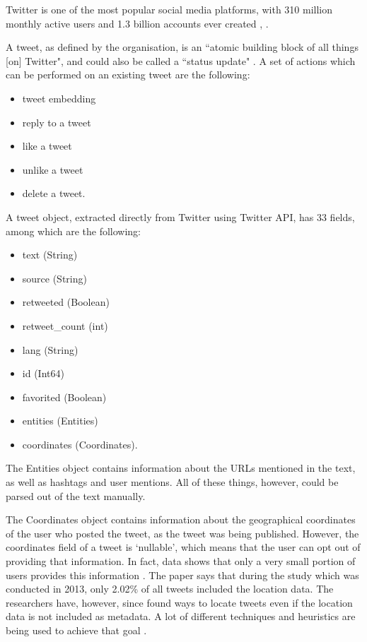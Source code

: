 Twitter is one of the most popular social media platforms, with 310 million monthly active users and 1.3 billion accounts ever created \cite{twittertcstats}, \cite{twitterbistats}. 

A tweet, as defined by the organisation, is an ``atomic building block of all things [on] Twitter", and could also be called a ``status update" \cite{twitterapi}. A set of actions which can be performed on an existing tweet are the following: 
\begin{itemize}
    \item tweet embedding
    \item reply to a tweet
    \item like a tweet
    \item unlike a tweet
    \item delete a tweet.
\end{itemize} 

A tweet object, extracted directly from Twitter using Twitter API, has 33 fields, among which are the following: 

\begin{itemize}
    \item text (String)
    \item source (String)
    \item retweeted (Boolean)
    \item retweet\_count (int)
    \item lang (String)
    \item id (Int64)
    \item favorited (Boolean)
    \item entities (Entities)
    \item coordinates (Coordinates).
\end{itemize}

The Entities object contains information about the URLs mentioned in the text, as well as hashtags and user mentions. All of these things, however, could be parsed out of the text manually. 

The Coordinates object contains information about the geographical coordinates of the user who posted the tweet, as the tweet was being published. However, the coordinates field of a tweet is `nullable', which means that the user can opt out of providing that information. In fact, data shows that only a very small portion of users provides this information \cite{leetaru2013mapping}. The paper says that during the study which was conducted in 2013, only 2.02\% of all tweets included the location data. The researchers have, however, since found ways to locate tweets even if the location data is not included as metadata. A lot of different techniques and heuristics are being used to achieve that goal \cite{leetaru2013mapping, han2014text}.

